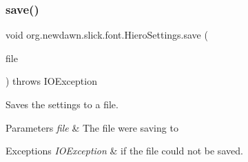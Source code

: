 \subsubsection{\texorpdfstring{save()}{save()}}
{\footnotesize\ttfamily void org.\+newdawn.\+slick.\+font.\+Hiero\+Settings.\+save (\begin{DoxyParamCaption}\item[{File}]{file }\end{DoxyParamCaption}) throws I\+O\+Exception\hspace{0.3cm}{\ttfamily [inline]}}

Saves the settings to a file.


\begin{DoxyParams}{Parameters}
{\em file} & The file we\textquotesingle{}re saving to \\
\hline
\end{DoxyParams}

\begin{DoxyExceptions}{Exceptions}
{\em I\+O\+Exception} & if the file could not be saved. \\
\hline
\end{DoxyExceptions}

